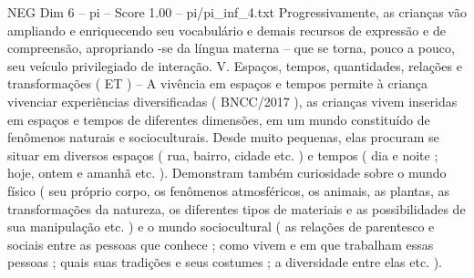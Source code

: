 \begin{textsample}{NEG Dim 6 – pi – Score 1.00 – pi/pi\_inf\_4.txt}
Progressivamente, as crianças vão ampliando e enriquecendo seu vocabulário e demais recursos de expressão e de compreensão, apropriando -se da língua materna – que se torna, pouco a pouco, seu veículo privilegiado de interação.
V.
Espaços, tempos, quantidades, relações e transformações ( ET ) – A vivência em espaços e tempos permite à criança vivenciar experiências diversificadas ( BNCC/2017 ), as crianças vivem inseridas em espaços e tempos de diferentes dimensões, em um mundo constituído de fenômenos naturais e socioculturais.
Desde muito pequenas, elas procuram se situar em diversos espaços ( rua, bairro, cidade etc. ) e tempos ( dia e noite ; hoje, ontem e amanhã etc. ).
Demonstram também curiosidade sobre o mundo físico ( seu próprio corpo, os fenômenos atmosféricos, os animais, as plantas, as transformações da natureza, os diferentes tipos de materiais e as possibilidades de sua manipulação etc. ) e o mundo sociocultural ( as relações de parentesco e sociais entre as pessoas que conhece ; como vivem e em que trabalham essas pessoas ; quais suas tradições e seus costumes ; a diversidade entre elas etc. ).

\end{textsample}
